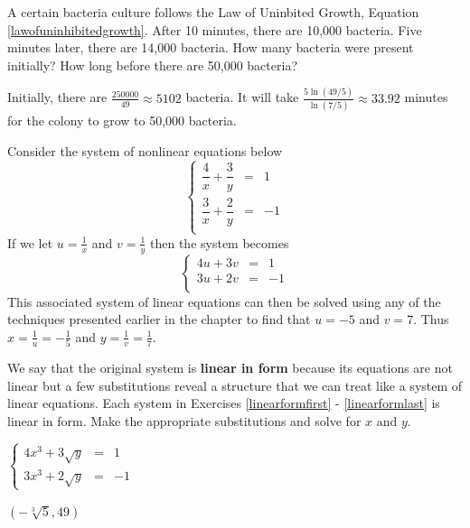 \documentclass{ximera}
\begin{document}
\begin{problem}
A certain bacteria culture follows the Law of Uninbited Growth, Equation \ref{lawofuninhibitedgrowth}.  After 10 minutes, there are 10,000 bacteria. Five minutes later, there are 14,000 bacteria.  How many bacteria were present initially?  How long before there are 50,000 bacteria?

\begin{solution}
    Initially, there are $\frac{250000}{49} \approx 5102$ bacteria.  It will take $\frac{5\ln(49/5)}{\ln(7/5)} \approx 33.92$ minutes for the colony to grow to 50,000 bacteria.
\end{solution}
\end{problem}

\begin{question}
Consider the system of nonlinear equations  below \[\left\{\begin{array}{rcr}  \dfrac{4}{x} + \dfrac{3}{y} & = & 1 \\[10pt] \dfrac{3}{x} + \dfrac{2}{y} & = & -1 \\ \end{array} \right.\]  If we let $u = \frac{1}{x}$ and $v = \frac{1}{y}$ then the system becomes \[\left\{\begin{array}{rcr}  4u + 3v & = & 1 \\ 3u + 2v & = & -1 \\ \end{array} \right.\] This associated system of linear equations can then be solved using any of the techniques presented earlier in the chapter to find that $u = -5$ and $v = 7$.  Thus $x = \frac{1}{u} = -\frac{1}{5}$ and $y = \frac{1}{v} = \frac{1}{7}$.  

We say that the original system is {\bf linear in form}  because its equations are not linear but a few substitutions reveal a structure that we can treat like a system of linear equations.  Each system in Exercises \ref{linearformfirst} - \ref{linearformlast}  is linear in form.  Make the appropriate substitutions and solve for $x$ and $y$.

\begin{problem}\label{linearformfirst}
$\left\{\begin{array}{rcr}  4x^{3} + 3\sqrt{y} & = & 1 \\ 3x^{3} + 2\sqrt{y} & = & -1  \end{array} \right.$ 

\begin{solution}
    $\left( -\sqrt[3]{5}, 49 \right)$
\end{solution}
\end{problem}
  

\end{question}
\end{document}
